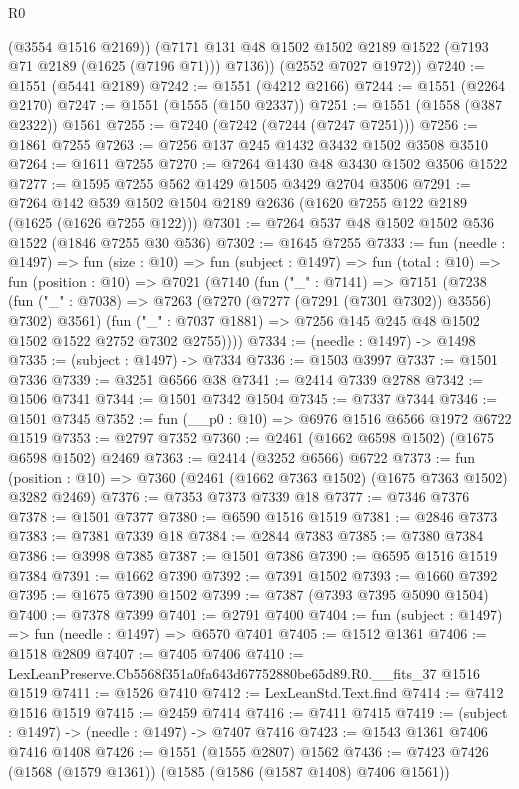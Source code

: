 \begin{lexlean}{R0}
\begin{coremodule}
          (@3554 @1516 @2169))
        (@7171 @131 @48 @1502 @1502 @2189 @1522 (@7193 @71 @2189 (@1625 (@7196 @71))) @7136))
      (@2552 @7027 @1972))
@7240 := @1551 (@5441 @2189)
@7242 := @1551 (@4212 @2166)
@7244 := @1551 (@2264 @2170)
@7247 := @1551 (@1555 (@150 @2337))
@7251 := @1551 (@1558 (@387 @2322)) @1561
@7255 := @7240 (@7242 (@7244 (@7247 @7251)))
@7256 := @1861 @7255
@7263 := @7256 @137 @245 @1432 @3432 @1502 @3508 @3510
@7264 := @1611 @7255
@7270 := @7264 @1430 @48 @3430 @1502 @3506 @1522
@7277 := @1595 @7255 @562 @1429 @1505 @3429 @2704 @3506
@7291 := @7264 @142 @539 @1502 @1504 @2189 @2636 (@1620 @7255 @122 @2189 (@1625 (@1626 @7255 @122)))
@7301 := @7264 @537 @48 @1502 @1502 @536 @1522 (@1846 @7255 @30 @536)
@7302 := @1645 @7255
@7333 := fun (needle : @1497) =>
  fun (size : @10) =>
  fun (subject : @1497) =>
  fun (total : @10) =>
  fun (position : @10) =>
  @7021
    (@7140
      (fun ("_" : @7141) =>
      @7151
        (@7238
          (fun ("_" : @7038) => @7263 (@7270 (@7277 (@7291 (@7301 @7302)) @3556) @7302) @3561)
          (fun ("_" : @7037 @1881) => @7256 @145 @245 @48 @1502 @1502 @1522 @2752 @7302 @2755))))
@7334 := (needle : @1497) -> @1498
@7335 := (subject : @1497) -> @7334
@7336 := @1503 @3997
@7337 := @1501 @7336
@7339 := @3251 @6566 @38
@7341 := @2414 @7339 @2788
@7342 := @1506 @7341
@7344 := @1501 @7342 @1504
@7345 := @7337 @7344
@7346 := @1501 @7345
@7352 := fun (__p0 : @10) => @6976 @1516 @6566 @1972 @6722 @1519
@7353 := @2797 @7352
@7360 := @2461 (@1662 @6598 @1502) (@1675 @6598 @1502) @2469
@7363 := @2414 (@3252 @6566) @6722
@7373 := fun (position : @10) => @7360 (@2461 (@1662 @7363 @1502) (@1675 @7363 @1502) @3282 @2469)
@7376 := @7353 @7373 @7339 @18
@7377 := @7346 @7376
@7378 := @1501 @7377
@7380 := @6590 @1516 @1519
@7381 := @2846 @7373
@7383 := @7381 @7339 @18
@7384 := @2844 @7383
@7385 := @7380 @7384
@7386 := @3998 @7385
@7387 := @1501 @7386
@7390 := @6595 @1516 @1519 @7384
@7391 := @1662 @7390
@7392 := @7391 @1502
@7393 := @1660 @7392
@7395 := @1675 @7390 @1502
@7399 := @7387 (@7393 @7395 @5090 @1504)
@7400 := @7378 @7399
@7401 := @2791 @7400
@7404 := fun (subject : @1497) => fun (needle : @1497) => @6570 @7401
@7405 := @1512 @1361
@7406 := @1518 @2809
@7407 := @7405 @7406
@7410 := LexLeanPreserve.Cb5568f351a0fa643d67752880be65d89.R0.__fits_37 @1516 @1519
@7411 := @1526 @7410
@7412 := LexLeanStd.Text.find
@7414 := @7412 @1516 @1519
@7415 := @2459 @7414
@7416 := @7411 @7415
@7419 := (subject : @1497) -> (needle : @1497) -> @7407 @7416
@7423 := @1543 @1361 @7406 @7416 @1408
@7426 := @1551 (@1555 @2807) @1562
@7436 := @7423 @7426 (@1568 (@1579 @1361)) (@1585 (@1586 (@1587 @1408) @7406 @1561))

\end{coremodule}
\end{lexlean}
